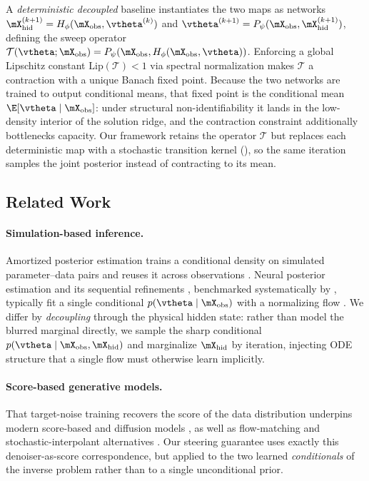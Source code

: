 \documentclass{article} %
\begin{document}
A \emph{deterministic decoupled} baseline instantiates the two maps as networks $\mX_{\mathrm{hid}}^{(k+1)} = H_\phi(\mX_{\mathrm{obs}}, \vtheta^{(k)})$ and $\vtheta^{(k+1)} = P_\psi(\mX_{\mathrm{obs}}, \mX_{\mathrm{hid}}^{(k+1)})$, defining the sweep operator $\mathcal{T}(\vtheta; \mX_{\mathrm{obs}}) = P_\psi(\mX_{\mathrm{obs}}, H_\phi(\mX_{\mathrm{obs}}, \vtheta))$. Enforcing a global Lipschitz constant $\mathrm{Lip}(\mathcal{T}) < 1$ via spectral normalization \citep{miyato2018spectral} makes $\mathcal{T}$ a contraction with a unique Banach fixed point. Because the two networks are trained to output conditional means, that fixed point is the conditional mean $\E[\vtheta \mid \mX_{\mathrm{obs}}]$: under structural non-identifiability it lands in the low-density interior of the solution ridge, and the contraction constraint additionally bottlenecks capacity. Our framework retains the operator $\mathcal{T}$ but replaces each deterministic map with a stochastic transition kernel (), so the same iteration samples the joint posterior instead of contracting to its mean.

\subsection{Related Work}
\label{sec:related}

\paragraph{Simulation-based inference.}
Amortized posterior estimation trains a conditional density on simulated parameter--data pairs and reuses it across observations \citep{cranmer2020frontier}. Neural posterior estimation and its sequential refinements \citep{papamakarios2016fast, greenberg2019automatic}, benchmarked systematically by \citet{lueckmann2021benchmarking}, typically fit a single conditional $p(\vtheta \mid \mX_{\mathrm{obs}})$ with a normalizing flow \citep{papamakarios2021normalizing}. We differ by \emph{decoupling} through the physical hidden state: rather than model the blurred marginal directly, we sample the sharp conditional $p(\vtheta \mid \mX_{\mathrm{obs}}, \mX_{\mathrm{hid}})$ and marginalize $\mX_{\mathrm{hid}}$ by iteration, injecting ODE structure that a single flow must otherwise learn implicitly.

\paragraph{Score-based generative models.}
That target-noise training recovers the score of the data distribution \citep{vincent2011connection, efron2011tweedie} underpins modern score-based and diffusion models \citep{song2019generative, ho2020denoising, song2021score}, as well as flow-matching and stochastic-interpolant alternatives \citep{lipman2023flow}. Our steering guarantee uses exactly this denoiser-as-score correspondence, but applied to the two learned \emph{conditionals} of the inverse problem rather than to a single unconditional prior.
\end{document}
